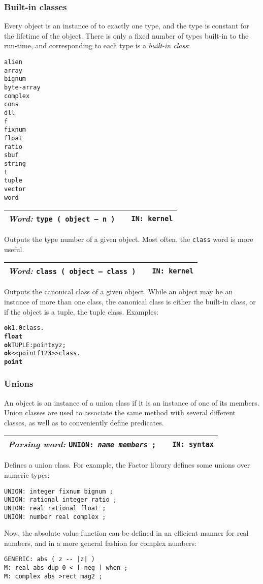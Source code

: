 \documentclass{report}
\newcommand{\parsingword}[3]{\index{#1}
\emph{Parsing word:} \texttt{#2} &&\texttt{IN: #3}}
\newcommand{\ordinaryword}[3]{\index{#1}
\emph{Word:} \texttt{#2} &&\texttt{IN: #3}}
\newcommand{\wordtable}[1]{

\begin{tabularx}{12cm}[t]{lXr}
\hline
#1\\
\hline
\end{tabularx}

}
\begin{document}
\subsubsection{Built-in classes}
Every object is an instance of to exactly one type, and the type is constant for the lifetime of the object. There is only a fixed number of types built-in to the run-time, and corresponding to each type is a \emph{built-in class}:
\begin{verbatim}
alien
array
bignum
byte-array
complex
cons
dll
f
fixnum
float
ratio
sbuf
string
t
tuple
vector
word
\end{verbatim}
\wordtable{
\ordinaryword{type}{type ( object -- n )}{kernel}
}
Outputs the type number of a given object. Most often, the \texttt{class} word is more useful.
\wordtable{
\ordinaryword{class}{class ( object -- class )}{kernel}
}
Outputs the canonical class of a given object. While an object may be an instance of more than one class, the canonical class is either the built-in class, or if the object is a tuple, the tuple class. Examples:
\begin{alltt}
\textbf{ok} 1.0 class .
\textbf{float}
\textbf{ok} TUPLE: point x y z ;
\textbf{ok} << point f 1 2 3 >> class .
\textbf{point}
\end{alltt}

\subsubsection{Unions}
An object is an instance of a union class if it is an instance of one of its members. Union classes are used to associate the same method with several different classes, as well as to conveniently define predicates.
\wordtable{
\parsingword{UNION:}{UNION: \emph{name} \emph{members} ;}{syntax}
}
Defines a union class. For example, the Factor library defines some unions over numeric types:
\begin{verbatim}
UNION: integer fixnum bignum ;
UNION: rational integer ratio ;
UNION: real rational float ;
UNION: number real complex ;
\end{verbatim}
Now, the absolute value function can be defined in an efficient manner
for real numbers, and in a more general fashion for complex numbers:
\begin{verbatim}
GENERIC: abs ( z -- |z| )
M: real abs dup 0 < [ neg ] when ;
M: complex abs >rect mag2 ;
\end{verbatim}
\end{document}
